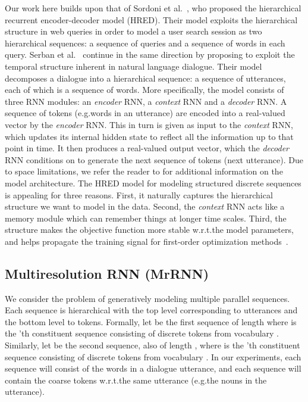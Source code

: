 \documentclass{article}
\begin{document}
Our work here builds upon that of
Sordoni et al.~\cite{sordoni2015ahier}, who proposed the hierarchical recurrent encoder-decoder model (HRED). 
Their model exploits the hierarchical structure in web queries in order to model a user search session as two hierarchical sequences: a sequence of queries and a sequence of words in each query.
Serban et al.~\cite{DBLP:conf/aaai/SerbanSBCP16} continue in the same direction by proposing to exploit the temporal structure inherent in natural language dialogue. 
Their model decomposes a dialogue into a hierarchical sequence: a sequence of utterances, each of which is a sequence of words.
More specifically, the model consists of three RNN modules: an \textit{encoder} RNN, a \textit{context} RNN and a \textit{decoder} RNN.
A sequence of tokens (e.g.\@ words in an utterance) are encoded into a real-valued vector by the \textit{encoder} RNN.
This in turn is given as input to the \textit{context} RNN, which updates its internal hidden state to reflect all the information up to that point in time.
It then produces a real-valued output vector, which the \textit{decoder} RNN conditions on to generate the next sequence of tokens (next utterance).
Due to space limitations, we refer the reader to \cite{sordoni2015ahier,DBLP:conf/aaai/SerbanSBCP16} for additional information on the model architecture.
The HRED model for modeling structured discrete sequences is appealing for three reasons.
First, it naturally captures the hierarchical structure we want to model in the data. 
Second, the \textit{context} RNN acts like a memory module which can remember things at longer time scales.
Third, the structure makes the objective function more stable w.r.t.\@ the model parameters, and helps propagate the training signal for first-order optimization methods~\cite{sordoni2015ahier}.

\subsection{Multiresolution RNN (MrRNN)}



We consider the problem of generatively modeling multiple parallel sequences.
Each sequence is hierarchical with the top level corresponding to utterances and the bottom level to tokens.
Formally, let  be the first sequence of length  where  is the 'th constituent sequence consisting of  discrete tokens from vocabulary .
Similarly, let  be the second sequence, also of length , where  is the 'th constituent sequence consisting of  discrete tokens from vocabulary .
In our experiments, each sequence  will consist of the words in a dialogue utterance, and each sequence  will contain the coarse tokens w.r.t.\@ the same utterance (e.g.\@ the nouns in the utterance).
\end{document}
